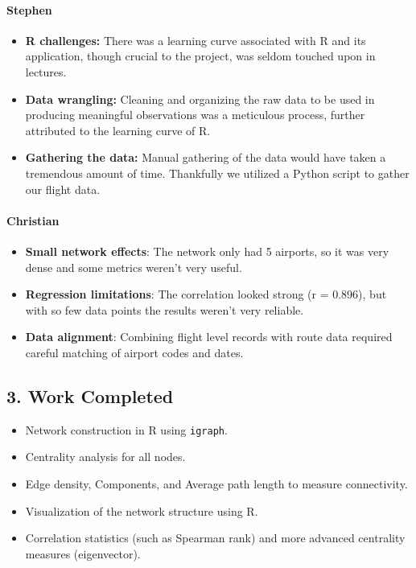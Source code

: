 \documentclass[11pt]{article}
\begin{document}
\paragraph*{Stephen}
\begin{itemize}[leftmargin=*]
    \item \textbf{R challenges:} There was a learning curve associated with R and its application, though crucial to the project, was seldom touched upon in lectures.
    \item \textbf{Data wrangling:} Cleaning and organizing the raw data to be used in producing meaningful observations was a meticulous process, further attributed to the learning curve of R.
    \item \textbf{Gathering the data:} Manual gathering of the data would have taken a tremendous amount of time. Thankfully we utilized a Python script to gather our flight data.
\end{itemize}

\paragraph{Christian}
\begin{itemize}[leftmargin=*]
    \item \textbf{Small network effects}: The network only had 5 airports, so it was very dense and some metrics weren’t very useful.
    \item \textbf{Regression limitations}: The correlation looked strong (r = 0.896), but with so few data points the results weren’t very reliable.
    \item \textbf{Data alignment}: Combining flight level records with route data required careful matching of airport codes and dates.
\end{itemize}

\subsection*{3. Work Completed}
\begin{itemize}[leftmargin=*]
    \item Network construction in R using \texttt{igraph}.
    \item Centrality analysis for all nodes.
    \item Edge density, Components, and Average path length to measure connectivity.
    \item Visualization of the network structure using R.
    \item Correlation statistics (such as Spearman rank) and more advanced centrality measures (eigenvector).
\end{itemize}
\end{document}
